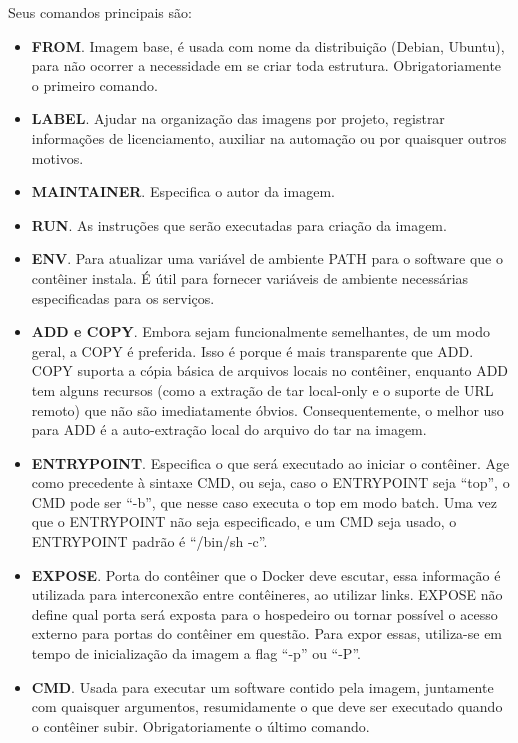 \documentclass[a4paper,11pt]{article}
\begin{document}
Seus comandos principais são: \vspace{-1em}
\begin{itemize}
	\item \textbf{FROM}. Imagem base, é usada com nome da distribuição (Debian, Ubuntu), para não ocorrer a necessidade em se criar toda estrutura. Obrigatoriamente o primeiro comando.
	\item \textbf{LABEL}. Ajudar na organização das imagens por projeto, registrar informações de licenciamento, auxiliar na automação ou por quaisquer outros motivos.
	\item \textbf{MAINTAINER}. Especifica o autor da imagem.
	\item \textbf{RUN}. As instruções que serão executadas para criação da imagem.
	\item \textbf{ENV}. Para atualizar uma variável de ambiente PATH para o software que o contêiner instala. É útil para fornecer variáveis de ambiente necessárias especificadas para os serviços.
	\item \textbf{ADD e COPY}. Embora sejam funcionalmente semelhantes, de um modo geral, a COPY é preferida. Isso é porque é mais transparente que ADD. COPY suporta a cópia básica de arquivos locais no contêiner, enquanto ADD tem alguns recursos (como a extração de tar local-only e o suporte de URL remoto) que não são imediatamente óbvios. Consequentemente, o melhor uso para ADD é a auto-extração local do arquivo do tar na imagem.
	\item \textbf{ENTRYPOINT}. Especifica o que será executado ao iniciar o contêiner. Age como precedente à sintaxe CMD, ou seja, caso o ENTRYPOINT seja ``top'', o CMD pode ser ``-b'', que nesse caso executa o top em modo batch. Uma vez que o ENTRYPOINT não seja especificado, e um CMD seja usado, o ENTRYPOINT padrão é ``/bin/sh -c''. 
	\item \textbf{EXPOSE}. Porta do contêiner que o Docker deve escutar, essa informação é utilizada para interconexão entre contêineres, ao utilizar links. EXPOSE não define qual porta será exposta para o hospedeiro ou tornar possível o acesso externo para portas do contêiner em questão. Para expor essas, utiliza-se em tempo de inicialização da imagem a flag ``-p'' ou ``-P''.
	\item \textbf{CMD}. Usada para executar um software contido pela imagem, juntamente com quaisquer argumentos, resumidamente o que deve ser executado quando o contêiner subir. Obrigatoriamente o último comando.
\end{itemize}
\end{document}
